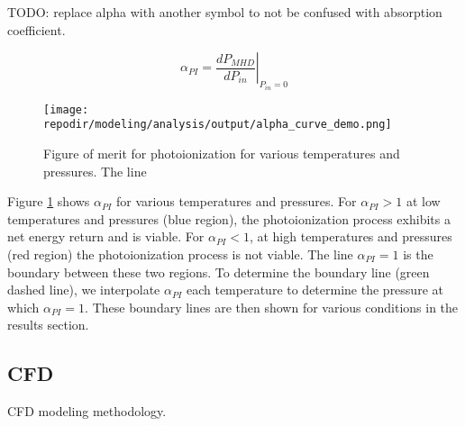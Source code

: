 TODO: replace alpha with another symbol to not be confused with absorption coefficient.


\begin{equation}
\alpha_{PI} = \left. \frac{{dP}_{MHD}}{{dP}_{in}} \right|_{P_{in}=0}
\end{equation}


\begin{figure}[h]
    \texttt{[image: \\repodir/modeling/analysis/output/alpha\_curve\_demo.png]} 
    \caption{Figure of merit for photoionization for various temperatures and pressures. The line}   
    \label{fig:alpha_line_demo}
\end{figure}

Figure \ref{fig:alpha_line_demo} shows $\alpha_{PI}$ for various temperatures and pressures.  For $\alpha_{PI} > 1$ at low temperatures and pressures (blue region), the photoionization process exhibits a net energy return and is viable. For $\alpha_{PI} < 1$, at high temperatures and pressures (red region) the photoionization process is not viable. The line $\alpha_{PI} = 1$ is the boundary between these two regions. To determine the boundary line (green dashed  line), we interpolate $\alpha_{PI}$ each temperature to determine the pressure at which $\alpha_{PI} = 1$. These boundary lines are then shown for various conditions in the results section.

\subsection{CFD}

CFD modeling methodology. 


